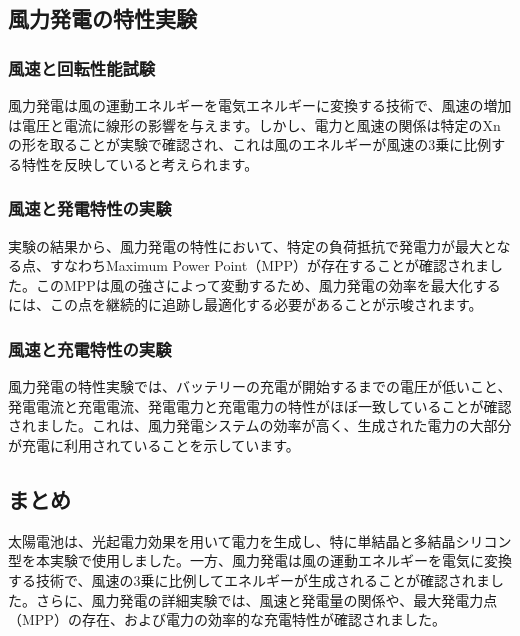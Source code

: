 \documentclass[a4paper,11pt,xelatex,ja=standard]{bxjsarticle}
\begin{document}
    \subsection{風力発電の特性実験}
        \subsubsection{風速と回転性能試験}
            風力発電は風の運動エネルギーを電気エネルギーに変換する技術で、風速の増加は電圧と電流に線形の影響を与えます。しかし、電力と風速の関係は特定のXnの形を取ることが実験で確認され、これは風のエネルギーが風速の3乗に比例する特性を反映していると考えられます。
        \subsubsection{風速と発電特性の実験}
            実験の結果から、風力発電の特性において、特定の負荷抵抗で発電力が最大となる点、すなわちMaximum Power Point（MPP）が存在することが確認されました。このMPPは風の強さによって変動するため、風力発電の効率を最大化するには、この点を継続的に追跡し最適化する必要があることが示唆されます。
        \subsubsection{風速と充電特性の実験}
            風力発電の特性実験では、バッテリーの充電が開始するまでの電圧が低いこと、発電電流と充電電流、発電電力と充電電力の特性がほぼ一致していることが確認されました。これは、風力発電システムの効率が高く、生成された電力の大部分が充電に利用されていることを示しています。

    \subsection{まとめ}
        太陽電池は、光起電力効果を用いて電力を生成し、特に単結晶と多結晶シリコン型を本実験で使用しました。一方、風力発電は風の運動エネルギーを電気に変換する技術で、風速の3乗に比例してエネルギーが生成されることが確認されました。さらに、風力発電の詳細実験では、風速と発電量の関係や、最大発電力点（MPP）の存在、および電力の効率的な充電特性が確認されました。
\end{document}
